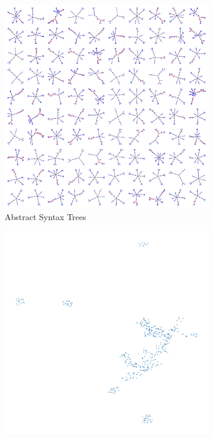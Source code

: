 \documentclass[a4paper,UKenglish,cleveref, autoref,pdfa]{lipics-v2021}
\begin{document}
\begin{figure}
\centering
\begin{subfigure}{.5\textwidth}
  \centering
  \captionsetup{justification=centering}
  \includegraphics[width=\linewidth]{spectrees.pdf}
    \caption{Abstract Syntax Trees}
    \label{fig:specsAST}
\end{subfigure}%
\begin{subfigure}{.5\textwidth}
  \centering
  \captionsetup{justification=centering}
  \includegraphics[width=\linewidth]{embed.pdf}

\end{subfigure}
\end{figure}
\end{document}
